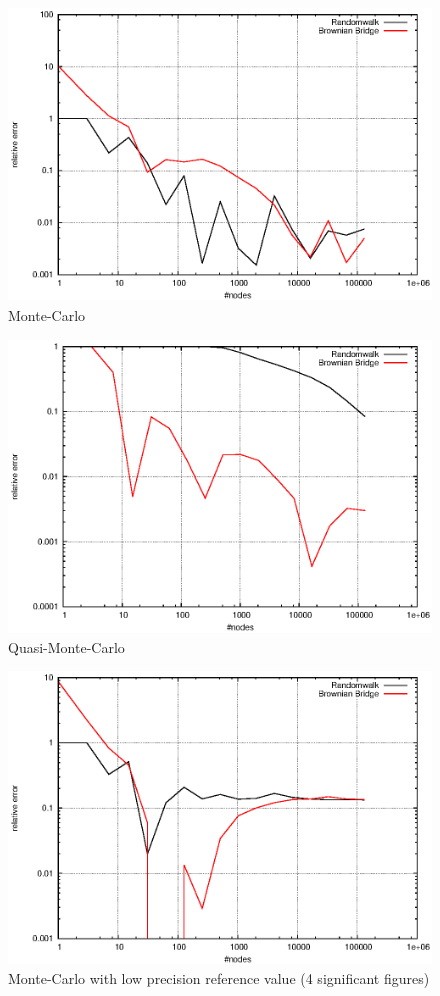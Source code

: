 \documentclass[]{article}
\begin{document}
\begin{figure}[!ht]
\centering
\includegraphics[width=.9\textwidth]{task2_mc_high.eps}
\caption{Monte-Carlo}
\label{fig:Task2a}
\end{figure}

\begin{figure}[!ht]
\centering
\includegraphics[width=.9\textwidth]{task2_qmc.eps}
\caption{Quasi-Monte-Carlo}
\label{fig:Task2b}
\end{figure}

\begin{figure}[!ht]
\centering
\includegraphics[width=.9\textwidth]{task2_mc_low.eps}
\caption{Monte-Carlo with low precision reference value (4 significant figures)}
\label{fig:Task2c}
\end{figure}
\clearpage
\end{document}
